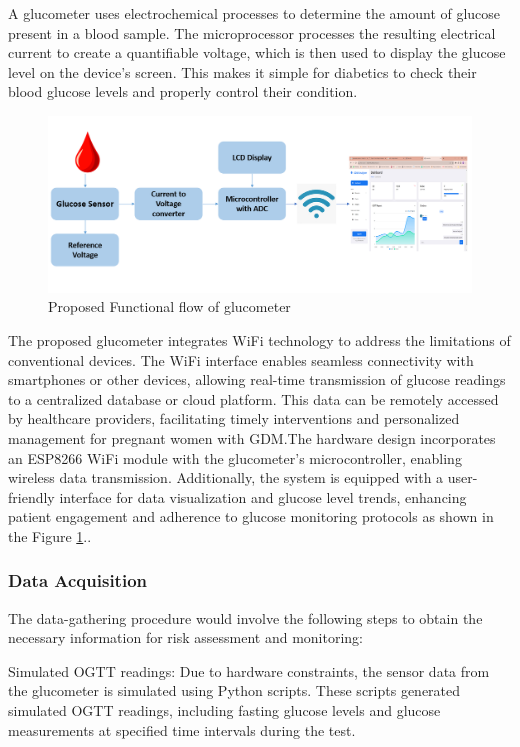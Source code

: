 \documentclass[conference,compsoc]{IEEEtran}
\begin{document}
A glucometer uses electrochemical processes to determine the amount of glucose present in a blood sample. The microprocessor processes the resulting electrical current to create a quantifiable voltage, which is then used to display the glucose level on the device's screen. This makes it simple for diabetics to check their blood glucose levels and properly control their condition.\\
\begin{figure}[htbp]
  \centering
  \includegraphics[width=0.8\columnwidth]{IEEEtran/glucometer_diag.PNG} %
  \caption{Proposed Functional flow of glucometer}
  \label{fig:glucometer_diag}
\end{figure}
The proposed glucometer integrates WiFi technology to address the limitations of conventional devices. The WiFi interface enables seamless connectivity with smartphones or other devices, allowing real-time transmission of glucose readings to a centralized database or cloud platform. This data can be remotely accessed by healthcare providers, facilitating timely interventions and personalized management for pregnant women with GDM.The hardware design incorporates an ESP8266 WiFi module with the glucometer's microcontroller, enabling wireless data transmission. Additionally, the system is equipped with a user-friendly interface for data visualization and glucose level trends, enhancing patient engagement and adherence to glucose monitoring protocols as shown in the Figure \ref{fig:glucometer_diag}..

\subsubsection{Data Acquisition}

The data-gathering procedure would involve the following steps to obtain the necessary information for risk assessment and monitoring:

Simulated OGTT readings: Due to hardware constraints, the sensor data from the glucometer is simulated using Python scripts. These scripts  generated simulated OGTT readings, including fasting glucose levels and glucose measurements at specified time intervals during the test.
\end{document}
